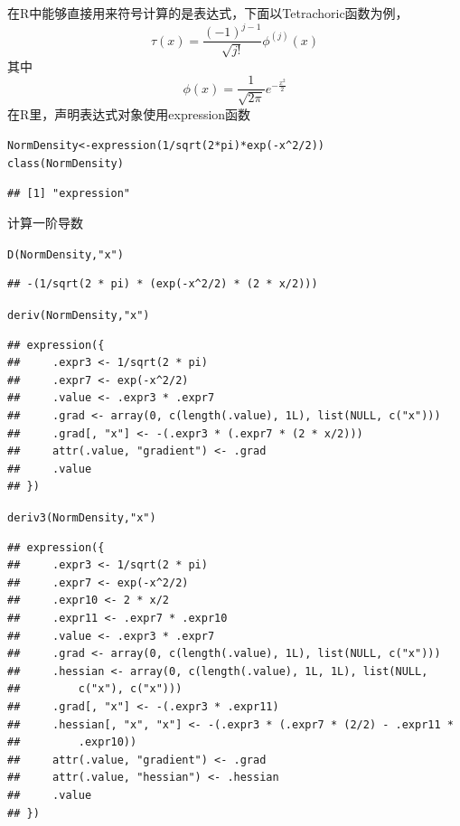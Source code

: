 \documentclass[a4paper]{ctexart}\usepackage[]{graphicx}\usepackage[]{color}
\makeatletter
\newcommand{\hlnum}[1]{\textcolor[rgb]{0.502,0.086,1}{#1}}%
\newcommand{\hlstr}[1]{\textcolor[rgb]{1,0.4,0.2}{#1}}%
\newcommand{\hlopt}[1]{\textcolor[rgb]{0.251,0.251,0.251}{#1}}%
\newcommand{\hlstd}[1]{\textcolor[rgb]{0.251,0.251,0.251}{#1}}%
\newcommand{\hlkwb}[1]{\textcolor[rgb]{0,0.439,0.902}{#1}}%
\newcommand{\hlkwd}[1]{\textcolor[rgb]{0.69,0.188,0.941}{#1}}%
\newenvironment{kframe}{%
 \def\at@end@of@kframe{}%
 \ifinner\ifhmode%
  \def\at@end@of@kframe{\end{minipage}}%
  \begin{minipage}{\columnwidth}%
 \fi\fi%
 \def\FrameCommand##1{\hskip\@totalleftmargin \hskip-\fboxsep
 \colorbox{shadecolor}{##1}\hskip-\fboxsep
     \hskip-\linewidth \hskip-\@totalleftmargin \hskip\columnwidth}%
 \MakeFramed {\advance\hsize-\width
   \@totalleftmargin\z@ \linewidth\hsize
   \@setminipage}}%
 {\par\unskip\endMakeFramed%
 \at@end@of@kframe}
\newenvironment{knitrout}{}{} %
\makeatother
\begin{document}
在R中能够直接用来符号计算的是表达式，下面以Tetrachoric函数为例，
$$\tau(x)=\frac{(-1)^{j-1}}{\sqrt{j !}}\phi^{(j)}(x)$$
其中
$$\phi(x)=\frac{1}{\sqrt{2\pi}}e^{-\frac{x^2}{2}}$$
在R里，声明表达式对象使用expression函数
\begin{knitrout}
\color{fgcolor}\begin{kframe}
\begin{alltt}
\hlstd{NormDensity} \hlkwb{<-} \hlkwd{expression}\hlstd{(}\hlnum{1}\hlopt{/}\hlkwd{sqrt}\hlstd{(}\hlnum{2} \hlopt{*} \hlstd{pi)} \hlopt{*} \hlkwd{exp}\hlstd{(}\hlopt{-}\hlstd{x}\hlopt{^}\hlnum{2}\hlopt{/}\hlnum{2}\hlstd{))}
\hlkwd{class}\hlstd{(NormDensity)}
\end{alltt}
\begin{verbatim}
## [1] "expression"
\end{verbatim}
\end{kframe}
\end{knitrout}
计算一阶导数
\begin{knitrout}
\color{fgcolor}\begin{kframe}
\begin{alltt}
\hlkwd{D}\hlstd{(NormDensity,} \hlstr{"x"}\hlstd{)}
\end{alltt}
\begin{verbatim}
## -(1/sqrt(2 * pi) * (exp(-x^2/2) * (2 * x/2)))
\end{verbatim}
\begin{alltt}
\hlkwd{deriv}\hlstd{(NormDensity,} \hlstr{"x"}\hlstd{)}
\end{alltt}
\begin{verbatim}
## expression({
##     .expr3 <- 1/sqrt(2 * pi)
##     .expr7 <- exp(-x^2/2)
##     .value <- .expr3 * .expr7
##     .grad <- array(0, c(length(.value), 1L), list(NULL, c("x")))
##     .grad[, "x"] <- -(.expr3 * (.expr7 * (2 * x/2)))
##     attr(.value, "gradient") <- .grad
##     .value
## })
\end{verbatim}
\begin{alltt}
\hlkwd{deriv3}\hlstd{(NormDensity,} \hlstr{"x"}\hlstd{)}
\end{alltt}
\begin{verbatim}
## expression({
##     .expr3 <- 1/sqrt(2 * pi)
##     .expr7 <- exp(-x^2/2)
##     .expr10 <- 2 * x/2
##     .expr11 <- .expr7 * .expr10
##     .value <- .expr3 * .expr7
##     .grad <- array(0, c(length(.value), 1L), list(NULL, c("x")))
##     .hessian <- array(0, c(length(.value), 1L, 1L), list(NULL, 
##         c("x"), c("x")))
##     .grad[, "x"] <- -(.expr3 * .expr11)
##     .hessian[, "x", "x"] <- -(.expr3 * (.expr7 * (2/2) - .expr11 * 
##         .expr10))
##     attr(.value, "gradient") <- .grad
##     attr(.value, "hessian") <- .hessian
##     .value
## })
\end{verbatim}
\end{kframe}
\end{knitrout}
\end{document}
